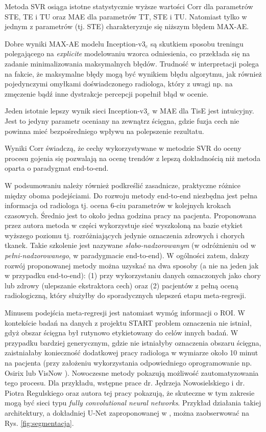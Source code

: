 Metoda SVR osiąga istotne statystycznie wyższe wartości Corr dla parametrów STE, TE i TU oraz MAE dla parametrów TT, STE i TU. Natomiast tylko w jednym z parametrów (tj. STE) charakteryzuje się niższym błędem MAX-AE. 

Dobre wyniki MAX-AE modelu Inception-v3$_{e}$ są skutkiem sposobu treningu polegającego na \textit{explicite} modelowaniu wzorca odniesienia, co przekłada się na zadanie minimalizowania maksymalnych błędów. Trudność w interpretacji polega na fakcie, że maksymalne błędy mogą być wynikiem błędu algorytmu, jak również pojedynczymi omyłkami doświadczonego radiologa, który z uwagi np. na zmęczenie bądź inne dystrakcje percepcji popełnił błąd w ocenie.

Jeden istotnie lepszy wynik sieci Inception-v3$_e$ w MAE dla TisE jest intuicyjny. Jest to jedyny parametr oceniany na zewnątrz ścięgna, gdzie fuzja cech nie powinna mieć bezpośredniego wpływu na polepszenie rezultatu. 

Wyniki Corr świadczą, że cechy wykorzystywane w metodzie SVR do oceny procesu gojenia się pozwalają na ocenę trendów z lepszą dokładnością niż metoda oparta o paradygmat end-to-end. 

W podsumowaniu należy również podkreślić zasadnicze, praktyczne różnice między oboma podejściami. Do rozwoju metody end-to-end niezbędna jest pełna informacja od radiologa tj. ocena 6-ciu parametrów w kolejnych krokach czasowych. Średnio jest to około jedna godzina pracy na pacjenta. Proponowana przez autora metoda w części wykorzystuje sieć wyszkoloną na bazie etykiet wyższego poziomu tj. rozróżniających jedynie oznaczenia zdrowych i chorych tkanek. Takie szkolenie jest nazywane \textit{słabo-nadzorowanym} (w odróżnieniu od w \textit{pełni-nadzorowanego}, \linebreak w paradygmacie end-to-end). W ogólności zatem, dalszy rozwój proponowanej metody można uzyskać na dwa sposoby (a nie na jeden jak w przypadku end-to-end): (1) przy wykorzystaniu danych oznaczonych jako chory lub zdrowy (ulepszanie ekstraktora cech) oraz (2) pacjentów z pełną oceną radiologiczną, który służyłby do sporadycznych ulepszeń etapu meta-regresji. 

Minusem podejścia meta-regresji jest natomiast wymóg informacji o ROI. W kontekście badań na danych z projektu START problem oznaczenia nie istniał, gdyż obszar ścięgna był rutynowo etykietowany do celów innych badań. W przypadku bardziej generycznym, gdzie nie istniałyby oznaczenia obszaru ścięgna, zaistniałaby konieczność dodatkowej pracy radiologa w wymiarze około 10 minut na pacjenta (przy założeniu wykorzystania odpowiedniego oprogramowanie np. Osirix \cite{Rosset2004} lub VisNow \cite{Nowinski_Borucki_2014}). Nowoczesne metody pokazują możliwość zautomatyzowania tego procesu. Dla przykładu, wstępne prace dr. Jędrzeja Nowosielskiego i dr. Piotra Regulskiego oraz autora tej pracy pokazują, że skuteczne w tym zakresie mogą być sieci typu \textit{fully convolutional neural networks}. Przykład działania takiej architektury, \linebreak a dokładniej U-Net zaproponowanej w \cite{Ronneberger2015}, można zaobserwować na Rys. \ref{fig:segmentacja}. 

